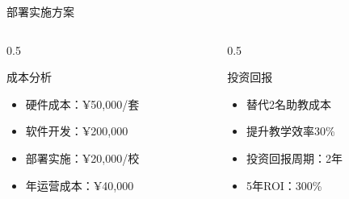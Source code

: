 \documentclass[aspectratio=169,12pt]{beamer}
\begin{document}
\begin{frame}{部署实施方案}
    \begin{columns}
        \begin{column}{0.5\textwidth}
            \begin{block}{成本分析}
                \begin{itemize}
                    \item 硬件成本：¥50,000/套
                    \item 软件开发：¥200,000
                    \item 部署实施：¥20,000/校
                    \item 年运营成本：¥40,000
                \end{itemize}
            \end{block}
        \end{column}
        \begin{column}{0.5\textwidth}
            \begin{block}{投资回报}
                \begin{itemize}
                    \item 替代2名助教成本
                    \item 提升教学效率30\%
                    \item 投资回报周期：2年
                    \item 5年ROI：300\%
                \end{itemize}
            \end{block}
        \end{column}
    \end{columns}
\end{frame}
\end{document}
